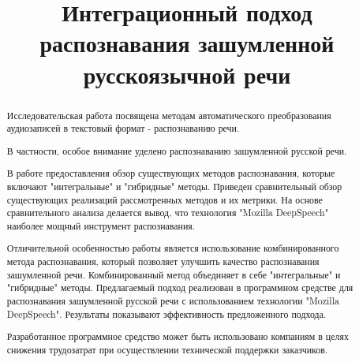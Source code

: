 \documentclass[conference]{IEEEtran}
\begin{document}
    \title{Интеграционный подход распознавания зашумленной русскоязычной речи}

    \author{
        }

    \maketitle

    \begin{abstract}
        Исследовательская работа посвящена методам автоматического преобразования аудиозаписей в текстовый формат - распознаванию речи.

        В частности, особое внимание уделено распознаванию зашумленной русской речи.

        В работе предоставления обзор существующих методов распознавания, которые включают "интегральные" и "гибридные" методы.
        Приведен сравнительный обзор существующих реализаций рассмотренных методов и их метрики.
        На основе сравнительного анализа делается вывод, что технология "Mozilla DeepSpeech" наиболее мощный инструмент распознавания.

        Отличительной особенностью работы является использование комбинированного метода распознавания, который позволяет улучшить качество распознавания зашумленной речи.
        Комбинированный метод объединяет в себе "интегральные" и "гибридные" методы.
        Предлагаемый подход реализован в программном средстве для распознавания зашумленной русской речи с использованием технологии "Mozilla DeepSpeech".
        Результаты показывают эффективность предложенного подхода.

        Разработанное программное средство может быть использовано компаниям в целях снижения трудозатрат при осуществлении технической поддержки заказчиков.
    \end{abstract}
\end{document}

